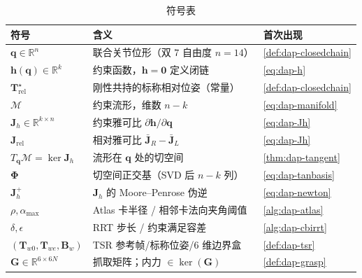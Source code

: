 \begin{table}[H]\centering\small
\caption{符号表}
\begin{tabular}{lll}
\toprule
符号 & 含义 & 首次出现 \\
\midrule
$\mathbf{q}\in\mathbb{R}^{n}$ & 联合关节位形（双 $7$ 自由度 $n=14$） & \cref{def:dap-closedchain} \\
$\mathbf{h}(\mathbf{q})\in\mathbb{R}^{k}$ & 约束函数，$\mathbf{h}=\mathbf{0}$ 定义闭链 & \cref{eq:dap-h} \\
$\mathbf{T}_{\text{rel}}^{\star}$ & 刚性共持的标称相对位姿（常量） & \cref{def:dap-closedchain} \\
$\mathcal{M}$ & 约束流形，维数 $n-k$ & \cref{eq:dap-manifold} \\
$\mathbf{J}_h\in\mathbb{R}^{k\times n}$ & 约束雅可比 $\partial\mathbf{h}/\partial\mathbf{q}$ & \cref{eq:dap-Jh} \\
$\mathbf{J}_{\text{rel}}$ & 相对雅可比 $\bar{\mathbf{J}}_R-\bar{\mathbf{J}}_L$ & \cref{eq:dap-Jh} \\
$T_{\mathbf{q}}\mathcal{M}=\ker\mathbf{J}_h$ & 流形在 $\mathbf{q}$ 处的切空间 & \cref{thm:dap-tangent} \\
$\boldsymbol{\Phi}$ & 切空间正交基（SVD 后 $n-k$ 列） & \cref{eq:dap-tanbasis} \\
$\mathbf{J}_h^{+}$ & $\mathbf{J}_h$ 的 Moore--Penrose 伪逆 & \cref{eq:dap-newton} \\
$\rho,\alpha_{\max}$ & Atlas 卡半径 / 相邻卡法向夹角阈值 & \cref{alg:dap-atlas} \\
$\delta,\epsilon$ & RRT 步长 / 约束满足容差 & \cref{alg:dap-cbirrt} \\
$(\mathbf{T}_{w0},\mathbf{T}_{we},\mathbf{B}_w)$ & TSR 参考帧/标称位姿/$6$ 维边界盒 & \cref{def:dap-tsr} \\
$\mathbf{G}\in\mathbb{R}^{6\times6N}$ & 抓取矩阵；内力 $\in\ker(\mathbf{G})$ & \cref{def:dap-grasp} \\
\bottomrule
\end{tabular}
\end{table}


